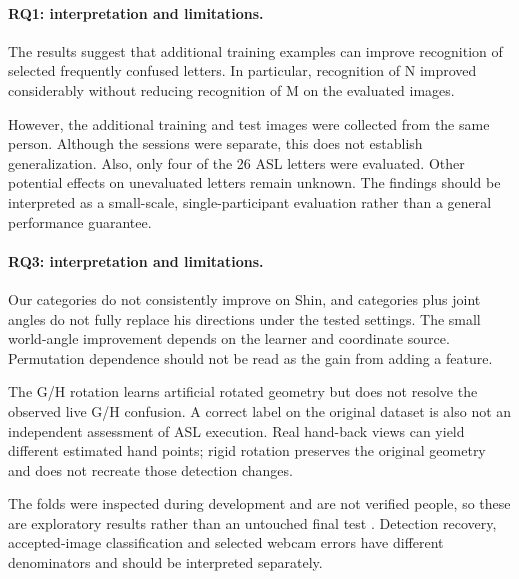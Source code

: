 \documentclass{article}
\begin{document}
\fi
\paragraph{RQ1: interpretation and limitations.}
The results suggest that additional training examples can improve recognition of selected frequently confused letters. In particular, recognition of N improved considerably without reducing recognition of M on the evaluated images. 

However, the additional training and test images were collected from the same person. Although the sessions were separate, this does not establish generalization. Also, only four of the 26 ASL letters were evaluated. Other potential effects on unevaluated letters remain unknown. The findings should be interpreted as a small-scale, single-participant evaluation rather than a general performance guarantee.
\paragraph{RQ3: interpretation and limitations.}
Our categories do not consistently improve on Shin, and categories plus joint angles do not fully replace his directions under the tested settings. The small world-angle improvement depends on the learner and coordinate source. Permutation dependence should not be read as the gain from adding a feature.

The G/H rotation learns artificial rotated geometry but does not resolve the observed live G/H confusion. A correct label on the original dataset is also not an independent assessment of ASL execution. Real hand-back views can yield different estimated hand points; rigid rotation preserves the original geometry and does not recreate those detection changes.

The folds were inspected during development and are not verified people, so these are exploratory results rather than an untouched final test \citep{ton-cawley2010}. Detection recovery, accepted-image classification and selected webcam errors have different denominators and should be interpreted separately.
\end{document}
